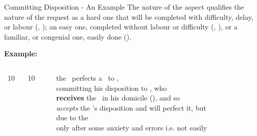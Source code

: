 \begin{frame}[t]{Committing Disposition - An Example}
The nature of the aspect qualifies the nature of the request as a hard one that will be completed with difficulty, delay, or labour (\Square, \Opposition); an easy one, completed without labour or difficulty (\Sextile, \Trine), or a familiar, or congenial one, easily done (\Conjunction).

\textbf{Example:}
\begin{columns}[T, onlytextwidth]
\Sun\ 10 \Aries\ \Square\ \Mars\ 10 \Capricorn

\rule{.1mm}{.30\textheight}

the \Sun\ perfects a \Square\  to \Mars, \\
committing his disposition to \Mars, who  \\
\textbf{receives} the \Sun\ in his domicile (\Aries), and so \\
\textsl{accepts} the \Sun's disposition and will perfect it, but \\
due to the \Square\, \\ 
only after some anxiety and errors i.e. not easily
\end{columns}

\end{frame}
